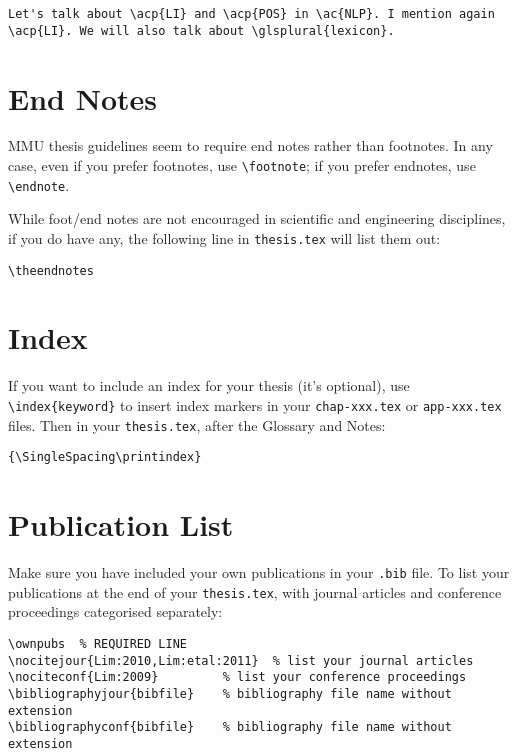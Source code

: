 \begin{lstlisting}
Let's talk about \acp{LI} and \acp{POS} in \ac{NLP}. I mention again \acp{LI}. We will also talk about \glsplural{lexicon}.
\end{lstlisting}


\section{End Notes}
MMU thesis guidelines seem to require end notes rather than footnotes. In any case, even if you prefer footnotes, use \lstinline|\footnote|; if you prefer endnotes, use \lstinline[moretexcs={endnote}]|\endnote|. 

While foot/end notes are not encouraged in scientific and engineering disciplines, if you do have any, the following line in \texttt{thesis.tex} will list them out:

\begin{lstlisting}[moretexcs={theendnotes}]
\theendnotes
\end{lstlisting}


\section{Index}\label{sec:index}
If you want to include an index for your thesis (it's optional), use \lstinline|\index{keyword}| to insert index markers in your \texttt{chap-xxx.tex} or \texttt{app-xxx.tex} files. Then in your \texttt{thesis.tex}, after the Glossary and Notes:

\medskip

\begin{lstlisting}[moretexcs={SingleSpacing,printindex}]
{\SingleSpacing\printindex}
\end{lstlisting}



\section{Publication List}\label{sec:ownpub}
Make sure you have included your own publications in your \texttt{.bib} file. To list your publications at the end of your \texttt{thesis.tex}, with journal articles and conference proceedings categorised separately:

\medskip

\begin{lstlisting}[moretexcs={ownpubs,nociteconf,bibliographyconf,nocitejour,bibliographyjour},keepspaces=true]
\ownpubs  % REQUIRED LINE
\nocitejour{Lim:2010,Lim:etal:2011}  % list your journal articles
\nociteconf{Lim:2009}         % list your conference proceedings
\bibliographyjour{bibfile}    % bibliography file name without extension
\bibliographyconf{bibfile}    % bibliography file name without extension
\end{lstlisting}
